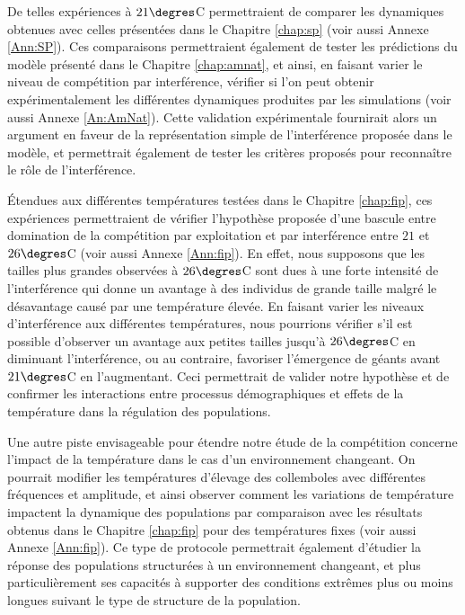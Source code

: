 De telles expériences à $21\degres$C permettraient de comparer les dynamiques
obtenues avec celles présentées dans le Chapitre \ref{chap:sp} (voir aussi
Annexe \ref{Ann:SP}). Ces comparaisons permettraient également de tester les
prédictions du modèle présenté dans le Chapitre \ref{chap:amnat}, et ainsi, en
faisant varier le niveau de compétition par interférence, vérifier si l'on peut
obtenir expérimentalement les différentes dynamiques produites par les
simulations (voir aussi Annexe \ref{An:AmNat}).
Cette validation expérimentale fournirait alors un argument en faveur de la
représentation simple de l'interférence proposée dans le modèle, et permettrait
également de tester les critères proposés pour reconnaître le rôle de
l'interférence.

Étendues aux différentes températures testées dans le Chapitre \ref{chap:fip},
ces expériences permettraient de vérifier l'hypothèse proposée d'une bascule
entre domination de la compétition par exploitation et par interférence entre
$21$ et $26\degres$C (voir aussi Annexe \ref{Ann:fip}). En effet, nous supposons
que les tailles plus grandes observées à $26\degres$C sont dues à une forte
intensité de l'interférence qui donne un avantage à des individus de grande
taille malgré le désavantage causé par une température élevée. En faisant varier
les niveaux d'interférence aux différentes températures, nous pourrions
vérifier s'il est possible d'observer un avantage aux petites tailles jusqu'à
$26\degres$C en diminuant l'interférence, ou au contraire, favoriser l'émergence
de géants avant $21\degres$C en l'augmentant. Ceci permettrait de valider notre
hypothèse et de confirmer les interactions entre processus démographiques et
effets de la température dans la régulation des populations.

Une autre piste envisageable pour étendre notre étude de la compétition
concerne l'impact de la température dans le cas d'un environnement changeant. On
pourrait modifier les températures d'élevage des collemboles avec différentes
fréquences et amplitude, et ainsi observer comment les variations de température
impactent la dynamique des populations par comparaison avec les résultats
obtenus dans le Chapitre \ref{chap:fip} pour des températures fixes (voir aussi
Annexe \ref{Ann:fip}). Ce type de protocole permettrait également d'étudier la
réponse des populations structurées à un environnement changeant, et plus
particulièrement ses capacités à supporter des conditions extrêmes plus ou
moins longues suivant le type de structure de la population.

